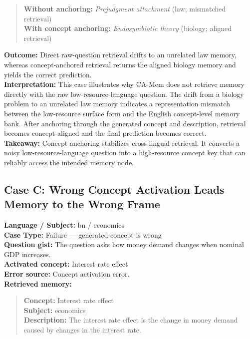 \documentclass[11pt]{article}
\begin{document}
\begin{quote}\small
\textbf{Without anchoring:} \textit{Prejudgment attachment} (law; mismatched retrieval) \\
\textbf{With concept anchoring:} \textit{Endosymbiotic theory} (biology; aligned retrieval)
\end{quote}

\noindent\textbf{Outcome:} Direct raw-question retrieval drifts to an unrelated law memory, whereas concept-anchored retrieval returns the aligned biology memory and yields the correct prediction.\\
\textbf{Interpretation:} This case illustrates why CA-Mem does not retrieve memory directly with the raw low-resource-language question. The drift from a biology problem to an unrelated law memory indicates a representation mismatch between the low-resource surface form and the English concept-level memory bank. After anchoring through the generated concept and description, retrieval becomes concept-aligned and the final prediction becomes correct.\\
\textbf{Takeaway:} Concept anchoring stabilizes cross-lingual retrieval. It converts a noisy low-resource-language question into a high-resource concept key that can reliably access the intended memory node.

\subsection{Case C: Wrong Concept Activation Leads Memory to the Wrong Frame}
\noindent\textbf{Language / Subject:} bn / economics\\
\textbf{Case Type:} Failure --- generated concept is wrong\\
\textbf{Question gist:} The question asks how money demand changes when nominal GDP increases.\\
\textbf{Activated concept:} Interest rate effect\\
\textbf{Error source:} Concept activation error.\\
\textbf{Retrieved memory:}

\begin{quote}\small
\textbf{Concept:} Interest rate effect \\
\textbf{Subject:} economics \\
\textbf{Description:} The interest rate effect is the change in money demand caused by changes in the interest rate.
\end{quote}
\end{document}
